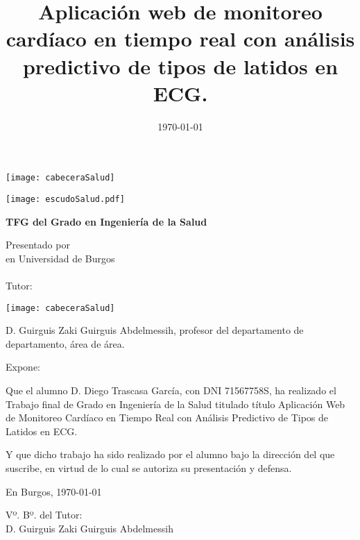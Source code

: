 \documentclass[a4paper,12pt,twoside]{memoir}
\title{Aplicación web de monitoreo cardíaco en tiempo real con análisis predictivo de tipos de latidos en ECG.}
\author{\nombre}
\date{\today}
\makeatletter
\def\maketitle{
  \null
  \thispagestyle{empty}
\begin{center}
  \noindent\texttt{[image: cabeceraSalud]}\vspace{1.5cm}%
\end{center}
  
  \begin{center}
    \begin{minipage}[c][1.5cm][c]{.20\textwidth}
        \texttt{[image: escudoSalud.pdf]}
    \end{minipage}
  \end{center}
  
  \begin{center}
    \colorbox{cpardoBox}{%
        \begin{minipage}{.8\textwidth}
          \vspace{.5cm}\Large
          \begin{center}
          \textbf{TFG del Grado en Ingeniería de la Salud}\vspace{.6cm}\\
          \textbf{\LARGE\@title{}}
          \end{center}
          \vspace{.2cm}
        \end{minipage}
    }%
  \end{center}
  
  \begin{center}%
  {%
    \noindent\LARGE
    Presentado por \@author{}\\ 
    en Universidad de Burgos\\
    \vspace{0.5cm}
    \noindent\Large
    \@date{}\\
    \vspace{0.5cm}
    Tutor: \@tutor{} \\
  }%
  \end{center}%
  \null
  \cleardoublepage
  }
\newcommand{\nombre}{Diego Trascasa García}
\newcommand{\nombreTutor}{Guirguis Zaki Guirguis Abdelmessih}
\newcommand{\dni}{71567758S}
\makeatother
\begin{document}
\maketitle


\newpage\null\thispagestyle{empty}\newpage

\thispagestyle{empty}


\noindent\texttt{[image: cabeceraSalud]}\vspace{1cm}

\noindent D. \nombreTutor, profesor del departamento de departamento, área de área.

\noindent Expone:

\noindent Que el alumno D. \nombre, con DNI \dni, ha realizado el Trabajo final de Grado en Ingeniería de la Salud titulado título Aplicación Web de Monitoreo Cardíaco en Tiempo Real con Análisis Predictivo de Tipos de Latidos en ECG. 

\noindent Y que dicho trabajo ha sido realizado por el alumno bajo la dirección del que suscribe, en virtud de lo cual se autoriza su presentación y defensa.

\begin{center} %
En Burgos, {\large \today}
\end{center}

\vfill\vfill\vfill

\begin{minipage}{0.45\textwidth}
\begin{flushleft} %
Vº. Bº. del Tutor:\\[2cm]
D. \nombreTutor
\end{flushleft}
\end{minipage}
\hfill
\begin{minipage}{0.45\textwidth}
\begin{flushleft} %
\end{flushleft}
\end{minipage}
\hfill

\vfill



\newpage\null\thispagestyle{empty}\newpage




\frontmatter
\end{document}
